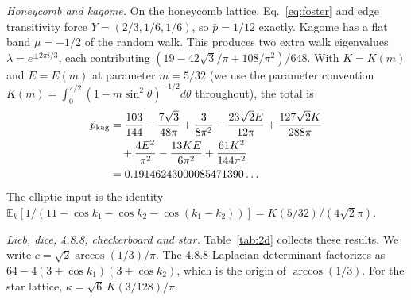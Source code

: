 \documentclass[aps,pra,10pt,twocolumn,superscriptaddress,nofootinbib]{revtex4-2}
\newcommand{\E}{\mathbb{E}}
\newcommand{\pbar}{\bar{p}}
\newcommand{\sq}{\sqrt{3}}
\begin{document}
\emph{Honeycomb and kagome.} On the honeycomb lattice, Eq.~\eqref{eq:foster} and edge
transitivity force $Y=(2/3,1/6,1/6)$, so $\pbar=1/12$ exactly. Kagome has a flat band
$\mu=-1/2$ of the random walk. This produces two extra walk eigenvalues
$\lambda=e^{\pm2\pi i/3}$, each contributing
$(19-42\sq/\pi+108/\pi^2)/648$. With $K=K(m)$ and $E=E(m)$ at parameter
$m=5/32$ (we use the parameter convention $K(m)=\int_0^{\pi/2}(1-m\sin^2\theta)^{-1/2}d\theta$
throughout), the total is
\begin{align}
\pbar_{\rm kag}&=\frac{103}{144}-\frac{7\sq}{48\pi}+\frac3{8\pi^2}
-\frac{23\sqrt2E}{12\pi}+\frac{127\sqrt2K}{288\pi}\nonumber\\
&\quad+\frac{4E^2}{\pi^2}-\frac{13KE}{6\pi^2}+\frac{61K^2}{144\pi^2}\nonumber\\
&=0.19146243000085471390\ldots
\end{align}
The elliptic input is the identity
$\E_k[1/(11-\cos k_1-\cos k_2-\cos(k_1-k_2))]=K(5/32)/(4\sqrt2\pi)$.

\emph{Lieb, dice, 4.8.8, checkerboard and star.} Table~\ref{tab:2d} collects
these results. We write $c=\sqrt2\arccos(1/3)/\pi$. The 4.8.8 Laplacian determinant
factorizes as $64-4(3+\cos k_1)(3+\cos k_2)$, which is the origin of $\arccos(1/3)$. For the star
lattice, $\kappa=\sqrt6\,K(3/128)/\pi$.
\end{document}
